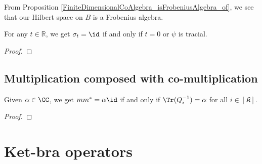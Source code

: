  From Proposition \ref{FiniteDimensionalCoAlgebra_isFrobeniusAlgebra_of}, we see that our Hilbert space on $B$ is a Frobenius algebra.
 
 \begin{proposition}\label{modAut_eq_id_iff}
  \leanok
  For any $t\in\mathbb{R}$, we get $\sigma_t=\id$ if and only if $t=0$ or $\psi$ is tracial.
 \end{proposition}
 \begin{proof}

 \end{proof}
 
\section{Multiplication composed with co-multiplication}

 \begin{proposition}\label{delta_form_iff}
  Given $\alpha\in\CC$, we get $mm^*=\alpha\id$ if and only if $\Tr(Q^{-1}_i)=\alpha$ for all $i\in[\mathfrak{K}]$.
 \end{proposition}
 \begin{proof}
 \end{proof}


\chapter{Ket-bra operators}

